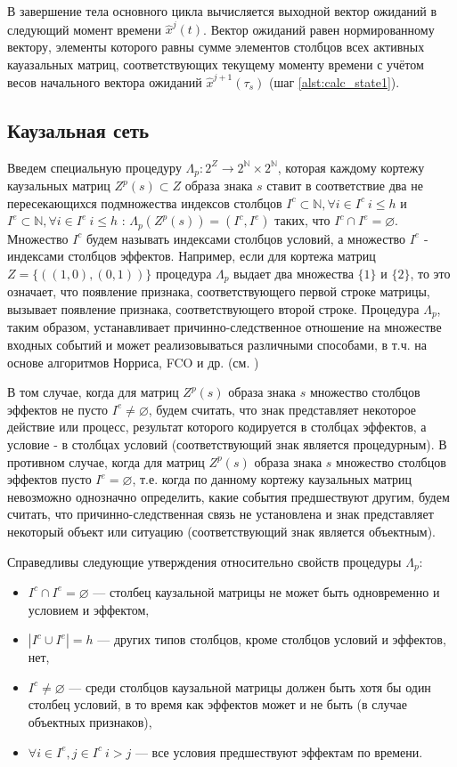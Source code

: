 \documentclass[12pt]{scrartcl}
\begin{document}
	В завершение тела основного цикла вычисляется выходной вектор ожиданий в следующий момент времени $\hat x^j(t)$. Вектор ожиданий равен нормированному вектору, элементы которого равны сумме элементов столбцов всех активных кауазальных матриц, соответствующих текущему моменту времени с учётом весов начального вектора ожиданий $\hat x^{j+1}(\tau_s)$ (шаг \ref{alst:calc_state1}).

	\subsection{Каузальная сеть}
	
	Введем специальную процедуру $\Lambda_p: 2^Z\rightarrow 2^{\mathbb N}\times 2^{\mathbb N}$, которая каждому кортежу каузальных матриц $Z^p(s)\subset Z$ образа знака $s$ ставит в соответствие два не пересекающихся подмножества индексов столбцов $I^c\subset\mathbb N, \forall i\in I^c\ i\leq h$ и $I^e\subset\mathbb N, \forall i\in I^e\ i\leq h$ : $\Lambda_p(Z^p(s))=(I^c,I^e)$ таких, что $I^c\cap I^e=\varnothing$. Множество $I^c$ будем называть индексами столбцов условий, а множество $I^e$ - индексами столбцов эффектов. Например, если для кортежа матриц $Z=\{((1, 0), (0, 1))\}$ процедура $\Lambda_p$ выдает два множества $\{1\}$ и $\{2\}$, то это означает, что появление признака, соответствующего первой строке матрицы, вызывает появление признака, соответствующего второй строке. Процедура $\Lambda_p$, таким образом, устанавливает причинно-следственное отношение на множестве входных событий и может реализовываться различными способами, в т.ч. на основе алгоритмов Норриса, FCO и др. (см. \cite{Kuznetsov2001,Kuznetsov1996})

	В том случае, когда для матриц $Z^p(s)$ образа знака $s$ множество столбцов эффектов не пусто $I^e \not=\varnothing$, будем считать, что знак представляет некоторое действие или процесс, результат которого кодируется в столбцах эффектов, а условие - в столбцах условий (соответствующий знак является процедурным). В противном случае, когда для матриц $Z^p(s)$ образа знака $s$ множество столбцов эффектов пусто $I^e=\varnothing$, т.е. когда по данному кортежу каузальных матриц невозможно однозначно определить, какие события предшествуют другим, будем считать, что причинно-следственная связь не установлена и знак представляет некоторый объект или ситуацию (соответствующий знак является объектным). 

	
	Справедливы следующие утверждения относительно свойств процедуры $\Lambda_p$:
	\begin{itemize}
		\item $I^c\cap I^e=\varnothing$ --- столбец каузальной матрицы не может быть одновременно и условием и эффектом,
		\item $|I^c\cup I^e|=h$ --- других типов столбцов, кроме столбцов условий и эффектов, нет,
		\item $I^c\not = \varnothing$ --- среди столбцов каузальной матрицы должен быть хотя бы один столбец условий, в то время как эффектов может и не быть (в случае объектных признаков),
		\item $\forall i\in I^e, j\in I^c\ i>j$ --- все условия предшествуют эффектам по времени.
	\end{itemize}
	
\end{document}
